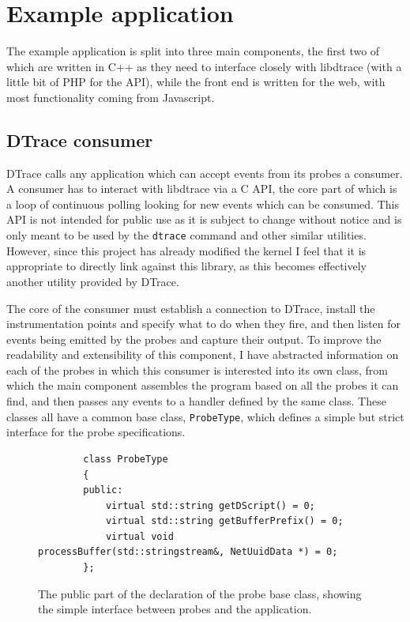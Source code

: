 \documentclass[a4paper,12pt,twoside,openright]{report}
\begin{document}
	\section{Example application}
	
	The example application is split into three main components, the first two of which are written in C++ as they need to interface closely with libdtrace (with a little bit of PHP for the API), while the front end is written for the web, with most functionality coming from Javascript.
	
	\subsection{DTrace consumer}
	
	DTrace calls any application which can accept events from its probes a consumer. A consumer has to interact with libdtrace via a C API, the core part of which is a loop of continuous polling looking for new events which can be consumed. This API is not intended for public use as it is subject to change without notice and is only meant to be used by the \texttt{dtrace} command and other similar utilities. However, since this project has already modified the kernel I feel that it is appropriate to directly link against this library, as this becomes effectively another utility provided by DTrace.
	
	The core of the consumer must establish a connection to DTrace, install the instrumentation points and specify what to do when they fire, and then listen for events being emitted by the probes and capture their output. To improve the readability and extensibility of this component, I have abstracted information on each of the probes in which this consumer is interested into its own class, from which the main component assembles the program based on all the probes it can find, and then passes any events to a handler defined by the same class. These classes all have a common base class, \texttt{ProbeType}, which defines a simple but strict interface for the probe specifications.
	
	\begin{figure}
		\begin{verbatim}
		class ProbeType
		{
		public:
		    virtual std::string getDScript() = 0;
		    virtual std::string getBufferPrefix() = 0;
		    virtual void        processBuffer(std::stringstream&, NetUuidData *) = 0;
		};
		\end{verbatim}
		\caption{The public part of the declaration of the probe base class, showing the simple interface between probes and the application.}
	\end{figure}
	
\end{document}
